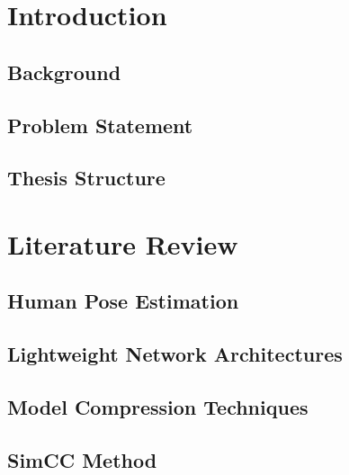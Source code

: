 \documentclass[a4paper,12pt]{article}
\begin{document}
\clearpage
\pagestyle{plain}
\tableofcontents

\pagestyle{main}
\section{Introduction}
\subsection{Background}


\subsection{Problem Statement}


\subsection{Thesis Structure}


\section{Literature Review}
\subsection{Human Pose Estimation}


\subsection{Lightweight Network Architectures}


\subsection{Model Compression Techniques}


\subsection{SimCC Method}

\end{document}
